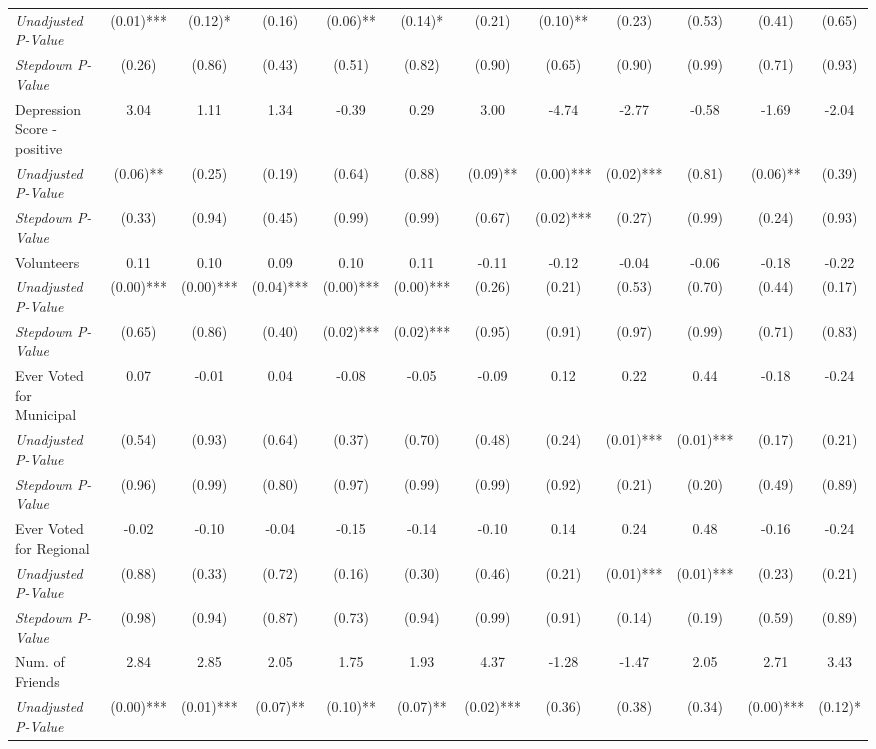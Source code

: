 \begin{tabular}{l c c c c c c c c c c c}
\quad \textit{Unadjusted P-Value} & (0.01)*** & (0.12)* & (0.16) & (0.06)** & (0.14)* & (0.21) & (0.10)** & (0.23) & (0.53) & (0.41) & (0.65) \\
\quad \textit{Stepdown P-Value} & (0.26) & (0.86) & (0.43) & (0.51) & (0.82) & (0.90) & (0.65) & (0.90) & (0.99) & (0.71) & (0.93) \\
Depression Score - positive & 3.04 & 1.11 & 1.34 & -0.39 & 0.29 & 3.00 & -4.74 & -2.77 & -0.58 & -1.69 & -2.04 \\
\quad \textit{Unadjusted P-Value} & (0.06)** & (0.25) & (0.19) & (0.64) & (0.88) & (0.09)** & (0.00)*** & (0.02)*** & (0.81) & (0.06)** & (0.39) \\
\quad \textit{Stepdown P-Value} & (0.33) & (0.94) & (0.45) & (0.99) & (0.99) & (0.67) & (0.02)*** & (0.27) & (0.99) & (0.24) & (0.93) \\
Volunteers & 0.11 & 0.10 & 0.09 & 0.10 & 0.11 & -0.11 & -0.12 & -0.04 & -0.06 & -0.18 & -0.22 \\
\quad \textit{Unadjusted P-Value} & (0.00)*** & (0.00)*** & (0.04)*** & (0.00)*** & (0.00)*** & (0.26) & (0.21) & (0.53) & (0.70) & (0.44) & (0.17) \\
\quad \textit{Stepdown P-Value} & (0.65) & (0.86) & (0.40) & (0.02)*** & (0.02)*** & (0.95) & (0.91) & (0.97) & (0.99) & (0.71) & (0.83) \\
Ever Voted for Municipal & 0.07 & -0.01 & 0.04 & -0.08 & -0.05 & -0.09 & 0.12 & 0.22 & 0.44 & -0.18 & -0.24 \\
\quad \textit{Unadjusted P-Value} & (0.54) & (0.93) & (0.64) & (0.37) & (0.70) & (0.48) & (0.24) & (0.01)*** & (0.01)*** & (0.17) & (0.21) \\
\quad \textit{Stepdown P-Value} & (0.96) & (0.99) & (0.80) & (0.97) & (0.99) & (0.99) & (0.92) & (0.21) & (0.20) & (0.49) & (0.89) \\
Ever Voted for Regional & -0.02 & -0.10 & -0.04 & -0.15 & -0.14 & -0.10 & 0.14 & 0.24 & 0.48 & -0.16 & -0.24 \\
\quad \textit{Unadjusted P-Value} & (0.88) & (0.33) & (0.72) & (0.16) & (0.30) & (0.46) & (0.21) & (0.01)*** & (0.01)*** & (0.23) & (0.21) \\
\quad \textit{Stepdown P-Value} & (0.98) & (0.94) & (0.87) & (0.73) & (0.94) & (0.99) & (0.91) & (0.14) & (0.19) & (0.59) & (0.89) \\
Num. of Friends & 2.84 & 2.85 & 2.05 & 1.75 & 1.93 & 4.37 & -1.28 & -1.47 & 2.05 & 2.71 & 3.43 \\
\quad \textit{Unadjusted P-Value} & (0.00)*** & (0.01)*** & (0.07)** & (0.10)** & (0.07)** & (0.02)*** & (0.36) & (0.38) & (0.34) & (0.00)*** & (0.12)* \\

\end{tabular}
